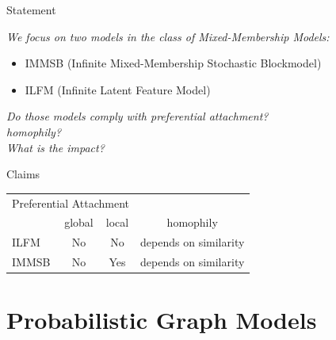 %
%
%
%

\begin{frame}[t]{Statement}
    \vspace{3em}

    \textit{\Large{We focus on two models in the class of Mixed-Membership Models: }}
    \begin{itemize}
        \item IMMSB (Infinite Mixed-Membership Stochastic Blockmodel)
        \item ILFM (Infinite Latent Feature Model) 
    \end{itemize}

    \vspace{2em}

    \textit{\Large{Do those models comply with preferential attachment?}}\\
    \vspace{1em}
    \textit{\Large{homophily?}}\\
    \vspace{1em}
    \textit{\Large{What is the impact?}}


\pause

\begin{block}{Claims}
\begin{tabular}{l|cc|c}

    \multicolumn{3}{c}{\hspace{1.3cm}Preferential Attachment}   \\
    \cmidrule(l){2-3} 
    &   global & local  &   homophily      \\
    \hline
    ILFM       & \cellcolor{red!25}No & \cellcolor{red!25}No   & depends on similarity  \\
    IMMSB       & \cellcolor{red!25}No & \cellcolor{green!25}Yes  & depends on similarity \\
\end{tabular}
\end{block}

\end{frame}

\section{Probabilistic Graph Models}

%
%

